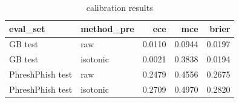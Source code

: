 \begin{table}[htbp]
\caption{calibration results}
\label{tab:calibration_results}
\begin{tabular}{llrrr}
\toprule
eval_set & method_pre & ece & mce & brier \\
\midrule
GB test & raw & 0.0110 & 0.0944 & 0.0197 \\
GB test & isotonic & 0.0021 & 0.3838 & 0.0194 \\
PhreshPhish test & raw & 0.2479 & 0.4556 & 0.2675 \\
PhreshPhish test & isotonic & 0.2709 & 0.4970 & 0.2820 \\
\bottomrule
\end{tabular}
\end{table}

